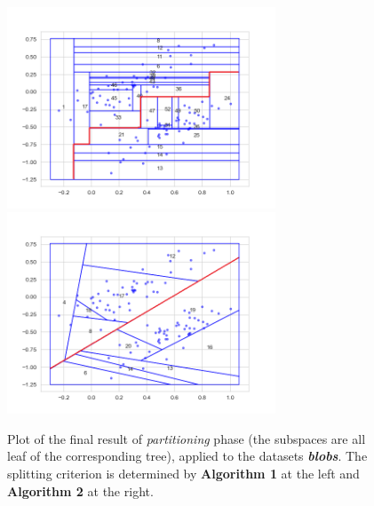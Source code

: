 \documentclass[a4paper]{article}
\begin{document}




\begin{figure}[H]
        \centering
\includegraphics[width=8cm]{grafici/2blobs_alg1_2+.png}
\includegraphics[width=8cm]{grafici/2blobs_alg2_2.png}
\caption{Plot of the final result of \emph{partitioning} phase (the subspaces are all leaf of the corresponding tree), applied to the datasets \emph{\textbf{blobs}}. The splitting criterion is determined by \textbf{Algorithm 1} at the left and \textbf{Algorithm 2} at the right.}
        \label{blobs_1vs2}
    \end{figure}   
\end{document}
